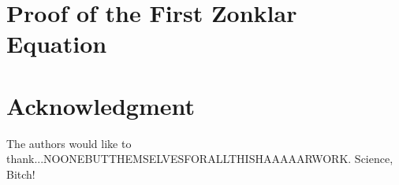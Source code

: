 \documentclass[conference]{IEEEtran}
\begin{document}
\appendices
\section{Proof of the First Zonklar Equation}
\blindtext

\section*{Acknowledgment}


The authors would like to thank...NOONEBUTTHEMSELVESFORALLTHISHAAAAARWORK. Science, Bitch!


\ifCLASSOPTIONcaptionsoff
  \newpage
\fi





%
%
%
\end{document}
